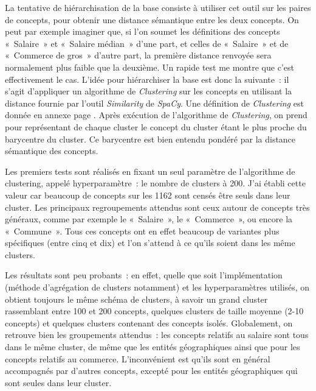 La tentative de hiérarchisation de la base consiste à utiliser cet outil sur les paires de concepts, pour obtenir une distance sémantique entre les deux concepts. On peut par exemple imaginer que, si l'on soumet les définitions des concepts «~Salaire~» et «~Salaire médian~» d'une part, et celles de «~Salaire~» et de «~Commerce de gros~» d'autre part, la première distance renvoyée sera normalement plus faible que la deuxième. Un rapide test me montre que c'est effectivement le cas. L'idée pour hiérarchiser la base est donc la suivante~: il s'agit d'appliquer un algorithme de \textit{Clustering} sur les concepts en utilisant la distance fournie par l'outil \textit{Similarity} de \textit{SpaCy}. Une définition de \textit{Clustering} est donnée en annexe page \pageref{clustering}. Après exécution de l'algorithme de \textit{Clustering}, on prend pour représentant de chaque cluster le concept du cluster étant le plus proche du barycentre du cluster. Ce barycentre est bien entendu pondéré par la distance sémantique des concepts.
\newline

Les premiers tests sont réalisés en fixant un seul paramètre de l'algorithme de clustering, appelé hyperparamètre~: le nombre de clusters à 200. J'ai établi cette valeur car beaucoup de concepts sur les 1162 sont censés être seuls dans leur cluster. Les principaux regroupements attendus sont ceux autour de concepts très généraux, comme par exemple le «~Salaire~», le «~Commerce~», ou encore la «~Commune~». Tous ces concepts ont en effet beaucoup de variantes plus spécifiques (entre cinq et dix) et l'on s'attend à ce qu'ils soient dans les même clusters.
\newline

Les résultats sont peu probants~: en effet, quelle que soit l'implémentation (méthode d'agrégation de clusters notamment) et les hyperparamètres utilisés, on obtient toujours le même schéma de clusters, à savoir un grand cluster rassemblant entre 100 et 200 concepts, quelques clusters de taille moyenne (2-10 concepts) et quelques clusters contenant des concepts isolés. Globalement, on retrouve bien les groupements attendus~: les concepts relatifs au salaire sont tous dans le même cluster, de même que les entités géographiques ainsi que pour les concepts relatifs au commerce. L'inconvénient est qu'ils sont en général accompagnés par d'autres concepts, excepté pour les entités géographiques qui sont seules dans leur cluster.
\newline

